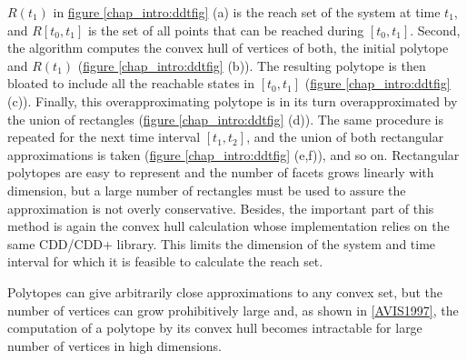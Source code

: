 \documentclass[letterpaper,10pt,english]{sphinxmanual}
\begin{document}
\(R(t_1)\) in \hyperref[chap_intro:ddtfig]{figure  \ref*{chap_intro:ddtfig}} (a) is the reach set of the system at
time \(t_1\), and \(R[t_0, t_1]\) is the set of all points that
can be reached during \([t_0, t_1]\). Second, the algorithm computes
the convex hull of vertices of both, the initial polytope and
\(R(t_1)\) (\hyperref[chap_intro:ddtfig]{figure  \ref*{chap_intro:ddtfig}} (b)). The resulting polytope is then
bloated to include all the reachable states in \([t_0,t_1]\) (\hyperref[chap_intro:ddtfig]{figure  \ref*{chap_intro:ddtfig}} (c)).
Finally, this overapproximating polytope is in its turn
overapproximated by the union of rectangles (\hyperref[chap_intro:ddtfig]{figure  \ref*{chap_intro:ddtfig}} (d)). The
same procedure is repeated for the next time interval \([t_1,t_2]\),
and the union of both rectangular approximations is taken (\hyperref[chap_intro:ddtfig]{figure  \ref*{chap_intro:ddtfig}} (e,f)),
and so on. Rectangular polytopes are easy to represent
and the number of facets grows linearly with dimension, but a large
number of rectangles must be used to assure the approximation is not
overly conservative. Besides, the important part of this method is again
the convex hull calculation whose implementation relies on the same
CDD/CDD+ library. This limits the dimension of the system and time
interval for which it is feasible to calculate the reach set.

Polytopes can give arbitrarily close approximations to any convex set,
but the number of vertices can grow prohibitively large and, as shown in
{\hyperref[chap_intro:avis1997]{{[}AVIS1997{]}}}, the computation of a polytope by its
convex hull becomes intractable for large number of vertices in high
dimensions.
\end{document}
